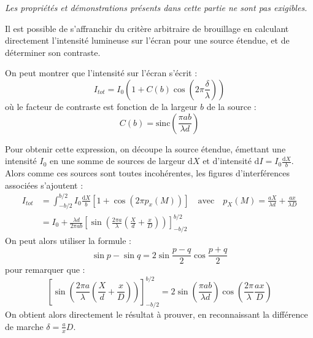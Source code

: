 \documentclass[11pt,fleqn]{book} %
\newcommand{\dd}{\mathrm{d}}
\begin{document}
\textit{Les propriétés et démonstrations présents dans cette partie ne sont pas exigibles.}

Il est possible de s'affranchir du critère arbitraire de brouillage en calculant directement l'intensité lumineuse sur l'écran pour une source étendue, et de déterminer son contraste.
\begin{proposition}
On peut montrer que l'intensité sur l'écran s'écrit :
\begin{equation}
	I_{tot} = I_0 \left( 1 + C(b) \cos\left(2 \pi \frac{\delta}{\lambda} \right) \right)
\end{equation}
où le facteur de contraste est fonction de la largeur $b$ de la source :
\begin{equation}
	C(b) = \mathrm{sinc}\left( \frac{\pi a b}{\lambda d}  \right)
\end{equation}
\end{proposition}

\begin{demonstration}
Pour obtenir cette expression, on découpe la source étendue, émettant une intensité $I_0$ en une somme de sources de largeur $\dd X$ et d'intensité $\dd I = I_0 \frac{\dd X}{b}$. Alors comme ces sources sont toutes incohérentes, les figures d'interférences associées s'ajoutent :
\begin{align}
	I_{tot} &= \int_{-b/2}^{b/2} I_0 \frac{\dd X}{b} \left[ 1 + \cos( 2 \pi p_{x}(M))\right] \quad \mathrm{avec} \quad p_X(M) = \frac{aX}{\lambda d} + \frac{ax}{\lambda D} \\
	&= I_0 + \frac{\lambda d}{2 \pi a b} \left[ \sin\left(\frac{2 \pi a}{\lambda} \left(\frac{X}{d} + \frac{x}{D}\right) \right) \right]_{-b/2}^{b/2}
\end{align}
On peut alors utiliser la formule :
\begin{equation}
	\sin p - \sin q = 2 \sin \frac{p-q}{2} \cos \frac{p+q}{2}
\end{equation}
pour remarquer que :
\begin{equation}
	\left[ \sin\left(\frac{2 \pi a}{\lambda} \left(\frac{X}{d} + \frac{x}{D}\right) \right) \right]_{-b/2}^{b/2} = 2 \sin\left(\frac{\pi a b}{\lambda d}\right) \cos\left( \frac{2 \pi}{\lambda} \frac{a x}{D} \right)
\end{equation}
	On obtient alors directement le résultat à prouver, en reconnaissant la différence de marche $\delta = \frac{a}{x}{D}$.
\end{demonstration}
\end{document}
